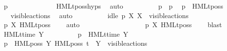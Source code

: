 \begin{isabellebody}
\ {\isacartoucheopen}p{\isacharprime}{\kern0pt}\ {\isasymTTurnstile}\ {\isasymphi}{\isacartoucheclose}\isanewline
\ \ \ \ \ \ \ \ \ \ \isamarkupfalse%
\ HMLt{\isacharunderscore}{\kern0pt}poss{\isachardot}{\kern0pt}hyps\ \isamarkupfalse%
\ auto\isanewline
\ \ \ \ \ \ \ \ \isamarkupfalse%
\ {\isacartoucheopen}p\ {\isasymlongmapsto}{\isasymalpha}\ p{\isacharprime}{\kern0pt}{\isacartoucheclose}\ \isamarkupfalse%
\ {\isacartoucheopen}p\ {\isasymTTurnstile}\ HMLt{\isacharunderscore}{\kern0pt}poss\ {\isasymalpha}\ {\isasymphi}{\isacartoucheclose}\ \isamarkupfalse%
\ {\isacartoucheopen}{\isasymalpha}\ {\isasymin}\ visible{\isacharunderscore}{\kern0pt}actions{\isacartoucheclose}\ \isamarkupfalse%
\ auto\isanewline
\ \ \ \ \ \ \ \ \isamarkupfalse%
\ {\isacartoucheopen}idle\ p\ X{\isacartoucheclose}\ {\isacartoucheopen}X\ {\isasymsubseteq}\ visible{\isacharunderscore}{\kern0pt}actions{\isacartoucheclose}\ \isamarkupfalse%
\ {\isacartoucheopen}p\ {\isasymTTurnstile}{\isacharbrackleft}{\kern0pt}X{\isacharbrackright}{\kern0pt}\ HMLt{\isacharunderscore}{\kern0pt}poss\ {\isasymalpha}\ {\isasymphi}{\isacartoucheclose}\ \isamarkupfalse%
\ auto\isanewline
\ \ \ \ \ \ \isamarkupfalse%
\isanewline
\ \ \ \ \isamarkupfalse%
\isanewline
\ \ \ \ \isamarkupfalse%
\ \isamarkupfalse%
\ {\isacartoucheopen}p\ {\isasymTTurnstile}{\isacharbrackleft}{\kern0pt}X{\isacharbrackright}{\kern0pt}\ HMLt{\isacharunderscore}{\kern0pt}poss\ {\isasymalpha}\ {\isasymphi}{\isacartoucheclose}\ \isamarkupfalse%
\ blast\isanewline
\ \ \isamarkupfalse%
\isanewline
{}\isamarkupfalse%
\isanewline
\ \ \isamarkupfalse%
\ {\isacharparenleft}{\kern0pt}HMLt{\isacharunderscore}{\kern0pt}time\ Y\ {\isasymphi}{\isacharparenright}{\kern0pt}\isanewline
\isanewline
\ \ \isacommand{{\isacharbraceleft}{\kern0pt}}\isamarkupfalse%
\isanewline
\ \ \ \ \isamarkupfalse%
\ {\isacartoucheopen}{\isasymtheta}{\isacharparenleft}{\kern0pt}p{\isacharparenright}{\kern0pt}\ {\isasymTurnstile}\ {\isasymsigma}{\isacharparenleft}{\kern0pt}HMLt{\isacharunderscore}{\kern0pt}time\ Y\ {\isasymphi}{\isacharparenright}{\kern0pt}{\isacartoucheclose}\isanewline
\ \ \ \ \isamarkupfalse%
\ {\isacartoucheopen}{\isasymtheta}{\isacharparenleft}{\kern0pt}p{\isacharparenright}{\kern0pt}\ {\isasymTurnstile}\ HML{\isacharunderscore}{\kern0pt}poss\ {\isacharparenleft}{\kern0pt}{\isasymepsilon}{\isacharbrackleft}{\kern0pt}Y{\isacharbrackright}{\kern0pt}{\isacharparenright}{\kern0pt}\ {\isacharparenleft}{\kern0pt}HML{\isacharunderscore}{\kern0pt}poss\ t\ {\isasymsigma}{\isacharparenleft}{\kern0pt}{\isasymphi}{\isacharparenright}{\kern0pt}{\isacharparenright}{\kern0pt}{\isacartoucheclose}\ {\isacartoucheopen}Y\ {\isasymsubseteq}\ visible{\isacharunderscore}{\kern0pt}actions{\isacartoucheclose}\ \isanewline

\end{isabellebody}
